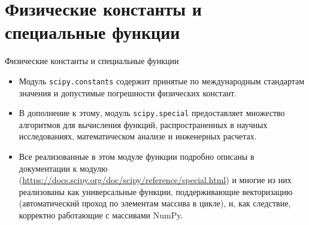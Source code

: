 \documentclass[aspectratio=169, mathserif]{beamer}	%
\begin{document}
\section{Физические константы и \\ специальные функции}
\sectionframe

\begin{frame}[fragile]{Физические константы и специальные функции}
\scriptsize
\begin{itemize}
	\item Модуль \texttt{scipy.constants} содержит принятые по международным стандартам значения и допустимые погрешности физических констант. 
	\item В дополнение к этому, модуль \texttt{scipy.special} предоставляет множество алгоритмов для вычисления функций, распространенных в научных исследованиях, математическом анализе и инженерных расчетах. 
	\item Все реализованные в этом модуле функции подробно описаны в документации к модулю (\url{https://docs.scipy.org/doc/scipy/reference/special.html}) и многие из них реализованы как универсальные функции, поддерживающие векторизацию (автоматический проход по элементам массива в цикле), и, как следствие, корректно работающие с массивами NumPy.
\end{itemize}
\vfil
\end{frame}
\end{document}
